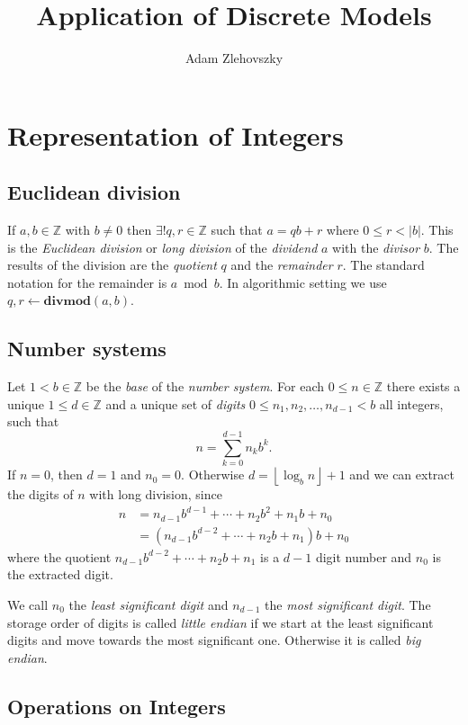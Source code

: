 \documentclass{article}
\newcommand{\Z}{\mathbb{Z}}
\newcommand*{\divmod}[2]{\mathbf{divmod}\left( #1, #2 \right)}
\begin{document}
\title{Application of Discrete Models}
\author{Adam Zlehovszky}
\maketitle

\section{Representation of Integers}

\subsection{Euclidean division}
If $a,b \in \Z$ with $b \ne 0$ then $\exists ! q,r \in \Z$ such that $a=qb+r$ where $0 \le r < |b|$.
This is the \emph{Euclidean division} or \emph{long division} of the \emph{dividend} $a$ with the \emph{divisor} $b$.
The results of the division are the \emph{quotient} $q$ and the \emph{remainder} $r$.
The standard notation for the remainder is $a \bmod b$. In algorithmic setting we use $q, r \gets \divmod{a}{b}$.

\subsection{Number systems}

Let $1 < b \in \Z$ be the \emph{base} of the \emph{number system}.
For each $0 \le n \in \Z$ there exists a unique $1 \le d \in \Z$ and a unique set of \emph{digits} $0 \le n_1, n_2, \ldots, n_{d-1} < b$ all integers, such that
\[
    n = \sum_{k=0}^{d-1}n_k b^{k}.
\]
If $n = 0$, then $d=1$ and $n_0 = 0$. Otherwise $d = \left \lfloor \log_{b} n \right \rfloor + 1$ and we can extract the digits of $n$ with long division, since
\begin{align*}
    n & = n_{d-1}b^{d-1} + \cdots + n_2 b^2 + n_1 b + n_0 \\
      & = \left( n_{d-1}b^{d-2} + \cdots + n_2 b + n_1 \right)b + n_0 
\end{align*}
where the quotient $n_{d-1}b^{d-2} + \cdots + n_2 b + n_1$ is a $d-1$ digit number and $n_0$ is the extracted digit.

We call $n_0$ the \emph{least significant digit} and $n_{d-1}$ the \emph{most significant digit}.
The storage order of digits is called \emph{little endian} if we start at the least significant digits and move towards the most significant one. Otherwise it is called \emph{big endian}.

\subsection{Operations on Integers}
\end{document}
